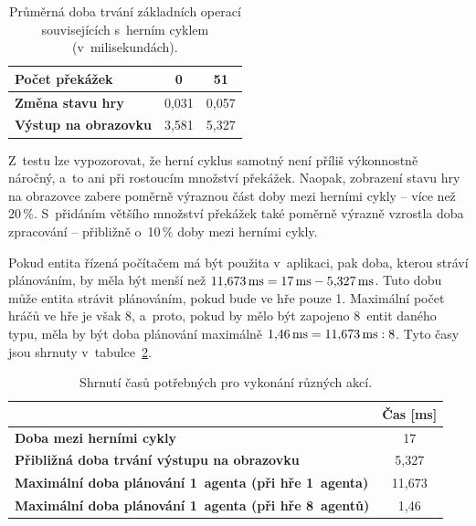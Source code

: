 \begin{table}[ht]
    \centering
    \begin{tabular}{|l|c|c|} \hline
        \textbf{Počet překážek}      & \textbf{0} & \textbf{51} \\ \hline\hline
        \textbf{Změna stavu hry}     & 0,031      & 0,057       \\ \hline
        \textbf{Výstup na obrazovku} & 3,581      & 5,327       \\ \hline
    \end{tabular}
    \caption{Průměrná doba trvání základních operací souvisejících s~herním cyklem (v~milisekundách).}
    \label{tab:benchmark-basics}
\end{table}

Z~testu lze vypozorovat, že herní cyklus samotný není příliš výkonnostně náročný, a~to ani při rostoucím množství překážek. Naopak, zobrazení stavu hry na obrazovce zabere poměrně výraznou část doby mezi herními cykly -- více než 20\,\%. S~přidáním většího množství překážek také poměrně výrazně vzrostla doba zpracování -- přibližně o~10\,\% doby mezi herními cykly.

Pokud entita řízená počítačem má být použita v~aplikaci, pak doba, kterou stráví plánováním, by měla být menší než $11{,}673\text{\,ms} = 17\text{\,ms} - 5{,}327\text{\,ms}$. Tuto dobu může entita strávit plánováním, pokud bude ve hře pouze 1. Maximální počet hráčů ve hře je však 8, a~proto, pokud by mělo být zapojeno 8~entit daného typu, měla by být doba plánování maximálně $1{,}46\text{\,ms} = 11{,}673\text{\,ms} : 8$. Tyto časy jsou shrnuty v~tabulce~\ref{tab:times-summary}.

\begin{table}[ht]
    \centering
    \begin{tabular}{|p{}|c|} \hline
         & \textbf{Čas [ms]} \\ \hline
        \textbf{Doba mezi herními cykly}                    & 17    \\ \hline
        \textbf{Přibližná doba trvání výstupu na obrazovku} & 5,327 \\ \hline
        \textbf{Maximální doba plánování 1~agenta (při hře 1~agenta)} & 11,673 \\ \hline
        \textbf{Maximální doba plánování 1~agenta (při hře 8~agentů)} & 1,46   \\ \hline
    \end{tabular}
    \caption{Shrnutí časů potřebných pro vykonání různých akcí.}
    \label{tab:times-summary}
\end{table}

